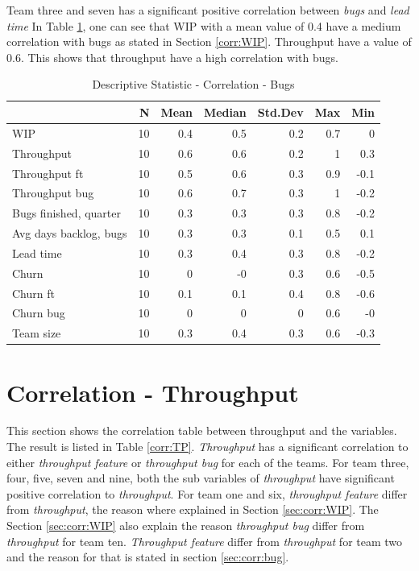\documentclass[UKenglish]{ifimaster}  %
\begin{document}
Team three and seven has a significant positive correlation between \textit{bugs} and \textit{lead time}
In Table \ref{DS:corr:Bugs}, one can see that WIP with a mean value of 0.4 have a medium correlation with bugs as stated in Section \ref{corr:WIP}.  Throughput  have a value of 0.6. This shows that throughput have a high correlation with bugs.

\begin{table}[!htbp]
 \centering
 \begin{tabular}{ | l | r | r | r | r | r | r | }
 \hline
& \bf{N} & \bf{Mean} & \bf{Median} & \bf{Std.Dev} & \bf{Max} & \bf{Min} \\ \hline
WIP  & 10 & 0.4 & 0.5 & 0.2 & 0.7 & 0\\ \hline
Throughput  & 10 & 0.6 & 0.6 & 0.2 & 1 & 0.3\\ \hline
Throughput ft  & 10 & 0.5 & 0.6 & 0.3 & 0.9 & -0.1\\ \hline
Throughput bug  & 10 & 0.6 & 0.7 & 0.3 & 1 & -0.2\\ \hline
Bugs finished, quarter  & 10 & 0.3 & 0.3 & 0.3 & 0.8 & -0.2\\ \hline
Avg days backlog, bugs  & 10 & 0.3 & 0.3 & 0.1 & 0.5 & 0.1\\ \hline
Lead time & 10 & 0.3 & 0.4 & 0.3 & 0.8 & -0.2\\ \hline
Churn  & 10 & 0 & -0 & 0.3 & 0.6 & -0.5\\ \hline
Churn ft  & 10 & 0.1 & 0.1 & 0.4 & 0.8 & -0.6\\ \hline
Churn bug  & 10 & 0 & 0 & 0 & 0.6 & -0\\ \hline
Team size  & 10 & 0.3 & 0.4 & 0.3 & 0.6 & -0.3\\ \hline
\end{tabular}
 \caption{Descriptive Statistic - Correlation - Bugs}
 \label{DS:corr:Bugs}
 \end{table}


\section {Correlation - Throughput}
\label{sec:corr:TP}
This section shows the correlation table between throughput and the variables. The result is listed in Table \ref{corr:TP}. \textit{Throughput} has a significant correlation to either \textit{throughput feature} or \textit{throughput bug} for each of the teams. For team three, four, five, seven and nine, both the sub variables of \textit{throughput} have significant positive correlation to \textit{throughput}. For team one and six, \textit{throughput feature} differ from \textit{throughput}, the reason where explained in Section \ref{sec:corr:WIP}.   The Section \ref{sec:corr:WIP} also explain the reason \textit{throughput bug} differ from \textit{throughput} for team ten.    \textit{Throughput feature} differ from \textit{throughput} for team two and the reason for that is stated in section \ref{sec:corr:bug}.
\end{document}
